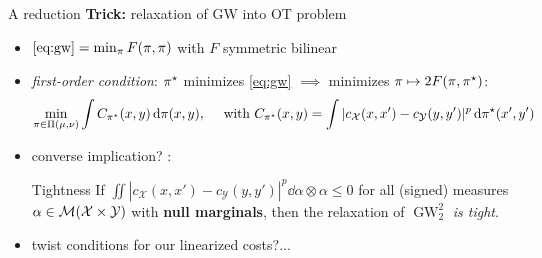 \documentclass[9pt,xcolor={dvipsnames}]{beamer}
\begin{document}
\begin{frame}{A reduction}
    \textbf{Trick:} relaxation of GW into OT problem
    \begin{itemize}
            \item $\cref{eq:gw}=\min_\pi F(\pi,\pi)$ with $F$ symmetric bilinear
            \item \emph{first-order condition}: $\pi^\star$ minimizes \cref{eq:gw} $\implies$ minimizes $\pi \mapsto 2 F(\pi, \pi^\star)$:
            \begin{equation*}
                \min_{\pi \in \Pi(\mu,\nu)} \int C_{\pi^\star}(x,y) \,\mathrm d \pi(x,y),\quad\text{ with } C_{\pi^\star}(x,y) = \int |c_{\mathcal{X}}(x,x')-c_{\mathcal{Y}}(y,y')|^p \,\mathrm d \pi^\star(x', y')
            \end{equation*}
            \item converse implication? \cite{sejourne2021unbalanced}:
        \begin{block}{Tightness}
            If $\iint |c_{\mathcal{X}}(x,x')-c_{\mathcal{Y}}(y,y')|^p\dd\alpha\otimes\alpha\leq0$ for all (signed) measures $\alpha\in\mathcal{M}(\mathcal{X} \times \mathcal{Y})$ with \textbf{null marginals}, then the relaxation of $\operatorname{GW}_2^2$ \emph{is tight}.
        \end{block}
        \item twist conditions for our linearized costs?...
    \end{itemize}

\end{frame}
\end{document}

